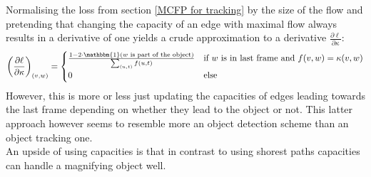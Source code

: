\documentclass{article}
\begin{document}
Normalising the loss from section \ref{MCFP for tracking} by the size of the flow and pretending that changing the capacity of an edge with maximal flow always results in a derivative of one yields a crude approximation to a derivative $\frac{\partial \ell}{\partial \kappa}$:
\begin{align*}
\left(\frac{\partial \ell}{\partial \kappa}\right)_{(v,w)} = 
\begin{cases}
\frac{1 - 2 \cdot \mathbbm{1}(w\textnormal{ is part of the object})}{\sum_{(u,t)} f(u,t)} &\textnormal{if } w \textnormal{ is in last frame and } f(v,w) = \kappa(v,w)\\
0 &\textnormal{else}
\end{cases}
\end{align*}
However, this is more or less just updating the capacities of edges leading towards the last frame depending on whether they lead to the object or not. This latter approach however seems to resemble more an object detection scheme than an object tracking one.\\
An upside of using capacities is that in contrast to using shorest paths capacities can handle a magnifying object well.
\end{document}
